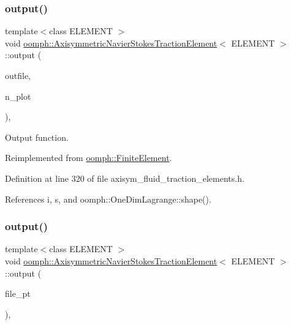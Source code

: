 \subsubsection{\texorpdfstring{output()}{output()}\hspace{0.1cm}{\footnotesize\ttfamily [2/4]}}
{\footnotesize\ttfamily template$<$class E\+L\+E\+M\+E\+NT $>$ \\
void \hyperlink{classoomph_1_1AxisymmetricNavierStokesTractionElement}{oomph\+::\+Axisymmetric\+Navier\+Stokes\+Traction\+Element}$<$ E\+L\+E\+M\+E\+NT $>$\+::output (\begin{DoxyParamCaption}\item[{std\+::ostream \&}]{outfile,  }\item[{const unsigned \&}]{n\+\_\+plot }\end{DoxyParamCaption})\hspace{0.3cm}{\ttfamily [inline]}, {\ttfamily [virtual]}}



Output function. 



Reimplemented from \hyperlink{classoomph_1_1FiniteElement_afa9d9b2670f999b43e6679c9dd28c457}{oomph\+::\+Finite\+Element}.



Definition at line 320 of file axisym\+\_\+fluid\+\_\+traction\+\_\+elements.\+h.



References i, s, and oomph\+::\+One\+Dim\+Lagrange\+::shape().

\mbox{\label{classoomph_1_1AxisymmetricNavierStokesTractionElement_aa264b6b88ec62adffd928382c82e93b4}} 
\subsubsection{\texorpdfstring{output()}{output()}\hspace{0.1cm}{\footnotesize\ttfamily [3/4]}}
{\footnotesize\ttfamily template$<$class E\+L\+E\+M\+E\+NT $>$ \\
void \hyperlink{classoomph_1_1AxisymmetricNavierStokesTractionElement}{oomph\+::\+Axisymmetric\+Navier\+Stokes\+Traction\+Element}$<$ E\+L\+E\+M\+E\+NT $>$\+::output (\begin{DoxyParamCaption}\item[{F\+I\+LE $\ast$}]{file\+\_\+pt }\end{DoxyParamCaption})\hspace{0.3cm}{\ttfamily [inline]}, {\ttfamily [virtual]}}



